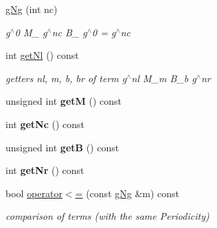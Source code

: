 \begin{DoxyCompactItemize}
\mbox{\label{classetvo_i_i_1_1g_ng_a040cd9c0eab1923496ead6c4545cfba1}} 
\mbox{\hyperlink{classetvo_i_i_1_1g_ng_a040cd9c0eab1923496ead6c4545cfba1}{g\+Ng}} (int nc)
\begin{DoxyCompactList}\small\item\em g$^\wedge$0 M\+\_ g$^\wedge$nc B\+\_ g$^\wedge$0 = g$^\wedge$nc \end{DoxyCompactList}\item 
\mbox{\label{classetvo_i_i_1_1g_ng_aa92563bccdaf0aaeccd21ff9dcedb3a2}} 
int \mbox{\hyperlink{classetvo_i_i_1_1g_ng_aa92563bccdaf0aaeccd21ff9dcedb3a2}{get\+Nl}} () const
\begin{DoxyCompactList}\small\item\em getters nl, m, b, br of term g$^\wedge$nl M\+\_\+m B\+\_\+b g$^\wedge$nr \end{DoxyCompactList}\item 
\mbox{\label{classetvo_i_i_1_1g_ng_a84fc15c3fcaa968ab41309082516dac3}} 
unsigned int {\bfseries getM} () const
\item 
\mbox{\label{classetvo_i_i_1_1g_ng_a7dde7c77f104f5fa1151164d175d1f59}} 
int {\bfseries get\+Nc} () const
\item 
\mbox{\label{classetvo_i_i_1_1g_ng_a742d4c1f56003400ff3570b19b1d7583}} 
unsigned int {\bfseries getB} () const
\item 
\mbox{\label{classetvo_i_i_1_1g_ng_aeedcb05be4d265a05d8b8e90fb123d4b}} 
int {\bfseries get\+Nr} () const
\item 
\mbox{\label{classetvo_i_i_1_1g_ng_ae119d681053751594bbd46b59ffd1b92}} 
bool \mbox{\hyperlink{classetvo_i_i_1_1g_ng_ae119d681053751594bbd46b59ffd1b92}{operator$<$=}} (const \mbox{\hyperlink{classetvo_i_i_1_1g_ng}{g\+Ng}} \&m) const
\begin{DoxyCompactList}\small\item\em comparison of terms (with the same Periodicity) \end{DoxyCompactList}\item 
\mbox{\label{classetvo_i_i_1_1g_ng_a37c236ac77b8c91f02cdb3c8060db301}} 

\end{DoxyCompactItemize}
